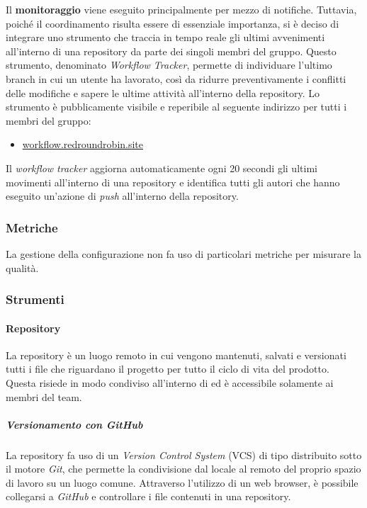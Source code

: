 	Il \textbf{monitoraggio} viene eseguito principalmente per mezzo di notifiche. Tuttavia, poiché il coordinamento risulta essere di essenziale importanza, si è deciso di integrare uno strumento che traccia in tempo reale gli ultimi avvenimenti all'interno di una repository da parte dei singoli membri del gruppo.
	Questo strumento, denominato \textit{Workflow Tracker}, permette di individuare l'ultimo branch in cui un utente ha lavorato, così da ridurre preventivamente i conflitti delle modifiche e sapere le ultime attività all'interno della repository.
	\newline
	Lo strumento è pubblicamente visibile e reperibile al seguente indirizzo per tutti i membri del gruppo:
	\begin{itemize}
		\item \href{https://workflow.redroundrobin.site}{workflow.redroundrobin.site}
	\end{itemize}
	Il \textit{workflow tracker} aggiorna automaticamente ogni 20 secondi gli ultimi movimenti all'interno di una repository e identifica tutti gli autori che hanno eseguito un'azione di \textit{push} all'interno della repository.



\subsubsection{Metriche}

La gestione della configurazione non fa uso di particolari metriche per misurare la qualità.


\subsubsection{Strumenti}


	\paragraph{Repository}
	

	La repository è un luogo remoto in cui vengono mantenuti, salvati e versionati tutti i file che riguardano il progetto per tutto il ciclo di vita del prodotto. Questa risiede in modo condiviso all'interno di  ed è accessibile solamente ai membri del team.

		\subparagraph{Versionamento con GitHub}

		La repository fa uso di un \textit{Version Control System} (VCS) di tipo distribuito sotto il motore \textit{Git}, che permette la condivisione dal locale al remoto del proprio spazio di lavoro su un luogo comune. Attraverso l'utilizzo di un web browser, è possibile collegarsi a \textit{GitHub} e controllare i file contenuti in una repository. 

